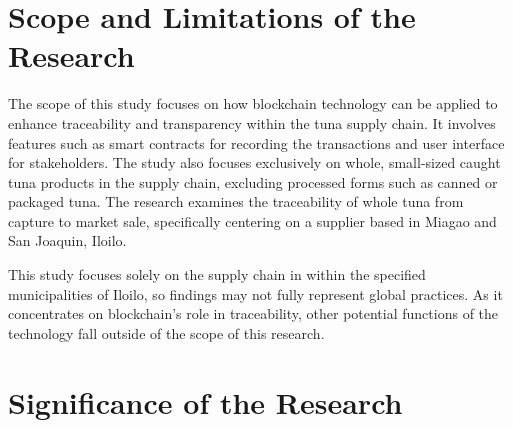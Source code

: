 \section{Scope and Limitations of the Research}
\label{sec:scopelimitations}

The scope of this study focuses on how blockchain technology can be applied to enhance traceability and transparency within the tuna supply chain. It involves features such as smart contracts for recording the transactions and user interface for stakeholders. The study also focuses exclusively on whole, small-sized caught tuna products in the supply chain, excluding processed forms such as canned or packaged tuna. The research examines the traceability of whole tuna from capture to market sale, specifically centering on a supplier based in Miagao and San Joaquin, Iloilo. 

\noindent This study focuses solely on the supply chain in within the specified municipalities of Iloilo, so findings may not fully represent global practices. As it concentrates on blockchain's role in traceability, other potential functions of the technology fall outside of the scope of this research.


\begin{comment}
	
	Generally, one paragraph should be allotted for each of your research objectives.
	
	Each paragraph contains a brief overview of the concept/theory and the purpose of doing the associated objective.
	
	Each paragraph also includes a description of the scope/limitation of your study.
	
	* Please refer to the slides for examples.
	
\end{comment}


\section{Significance of the Research}
\label{sec:significance}

